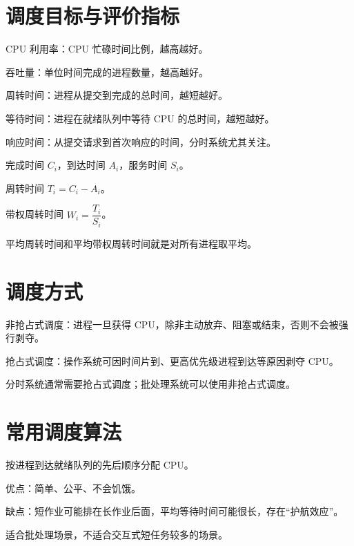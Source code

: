 \section{调度目标与评价指标}
\begin{points}
  \item CPU 利用率：CPU 忙碌时间比例，越高越好。
  \item 吞吐量：单位时间完成的进程数量，越高越好。
  \item 周转时间：进程从提交到完成的总时间，越短越好。
  \item 等待时间：进程在就绪队列中等待 CPU 的总时间，越短越好。
  \item 响应时间：从提交请求到首次响应的时间，分时系统尤其关注。
\end{points}


\begin{points}
  \item 完成时间 $C_i$，到达时间 $A_i$，服务时间 $S_i$。
  \item 周转时间 $T_i=C_i-A_i$。
  \item 带权周转时间 $W_i=\dfrac{T_i}{S_i}$。
  \item 平均周转时间和平均带权周转时间就是对所有进程取平均。
\end{points}


\section{调度方式}
\begin{points}
  \item 非抢占式调度：进程一旦获得 CPU，除非主动放弃、阻塞或结束，否则不会被强行剥夺。
  \item 抢占式调度：操作系统可因时间片到、更高优先级进程到达等原因剥夺 CPU。
  \item 分时系统通常需要抢占式调度；批处理系统可以使用非抢占式调度。
\end{points}


\section{常用调度算法}
\begin{points}
  \item 按进程到达就绪队列的先后顺序分配 CPU。
  \item 优点：简单、公平、不会饥饿。
  \item 缺点：短作业可能排在长作业后面，平均等待时间可能很长，存在“护航效应”。
  \item 适合批处理场景，不适合交互式短任务较多的场景。
\end{points}


